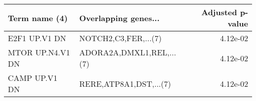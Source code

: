 \begin{tabular}{llr}
\toprule
   Term name (4) &     Overlapping genes... &  Adjusted p-value \\
\midrule
   E2F1 UP.V1 DN &     NOTCH2,C3,FER,...(7) &          4.12e-02 \\
MTOR UP.N4.V1 DN & ADORA2A,DMXL1,REL,...(7) &          4.12e-02 \\
   CAMP UP.V1 DN &   RERE,ATP8A1,DST,...(7) &          4.12e-02 \\
\bottomrule
\end{tabular}
